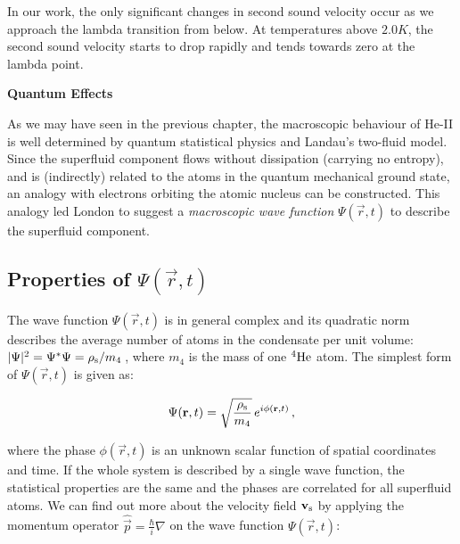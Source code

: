 In our work, the only significant changes in second sound velocity occur as we approach the lambda transition from below. At temperatures above $2.0 \unit{K}$, the second sound velocity starts to drop rapidly and tends towards zero at the lambda point.

\newpage














{\Huge \bfseries Quantum Effects}
\vspace{1cm}

As we may have seen in the previous chapter, the macroscopic behaviour of He-II is well determined by quantum statistical physics and Landau's two-fluid model. Since the superfluid component flows without dissipation (carrying no entropy), and is (indirectly) related to the atoms in the quantum mechanical ground state, an analogy with electrons orbiting the atomic nucleus can be constructed. This analogy led London to suggest a \textit{macroscopic wave function} $\Psi (\vec{r},t)$ to describe the superfluid component.

\subsection*{Properties of $\Psi (\vec{r},t)$}

The wave function $\Psi (\vec{r},t)$ is in general complex and its quadratic norm describes the average number of atoms in the condensate per unit volume:
$\vert \Psi \vert^2 =\Psi^* \Psi= \rho_{\mathrm{s}}/m_4\,$, where $m_4$ is the mass of one ${}^4\mathrm{He}$ atom. The simplest form of $\Psi (\vec{r},t)$ is given as:

\begin{equation}
\Psi(\mathbf{r},t) = \sqrt{\frac{\rho_{\mathrm{s}}}{m_4}}\,
e^{i \phi (\mathbf{r},t)}\,,
\label{psi}
\end{equation}

where the phase $\phi (\vec{r},t)$ is an unknown scalar function of spatial coordinates and time. If the whole system is described by a single wave function, the statistical properties are the same and the phases are correlated for all superfluid atoms. We can find out more about the velocity field $ \mathbf{v}_{\mathrm{s}} $ by applying the momentum operator $\hat{\vec{p}} = \frac{\hbar}{i} \nabla$ on the wave function $\Psi (\vec{r},t)$:

